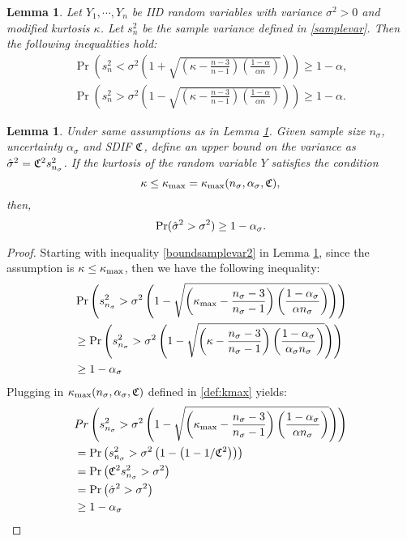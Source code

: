\documentclass{iitthesis}
\newtheorem{lemma}[theorem]{Lemma}
\theoremstyle{definition}
\begin{document}
\begin{lemma}\cite[Lemma 1]{HJLO12} \label{samplevarbound}
Let $Y_1,\cdots,Y_n$ be IID random variables with variance $\sigma^2>0$ and modified kurtosis $\kappa$. Let $s_n^2$ be the sample variance defined in \eqref{samplevar}. Then the following inequalities hold: 
\begin{subequations}
\begin{gather}
\Pr\left( s_n^2 < \sigma^2 \left (1+\sqrt{\left (\kappa-\frac{n-3}{n-1}\right)\left (\frac{1-\alpha}{\alpha n}\right )}\right)\right) \geq 1-\alpha,\label{boundsamplevar1}\\ 
\Pr\left( s_n^2 >\sigma^2 \left (1-\sqrt{\left (\kappa-\frac{n-3}{n-1}\right)\left (\frac{1-\alpha}{\alpha n}\right )}\right)\right) \geq 1-\alpha.\label{boundsamplevar2}
\end{gather}
\end{subequations}

\end{lemma}
\begin{lemma}\label{lowerboundhsigma}
Under same assumptions as in Lemma \ref{samplevarbound}. Given sample size $n_\sigma$, uncertainty $\alpha_\sigma$ and SDIF $\mathfrak{C}$, define an upper bound on the variance as $\hat{\sigma}^2 = \mathfrak{C}^2 s_{n_{\sigma}}^2$. If the kurtosis of the random variable $Y$ satisfies the condition $$\kappa \leq \kappa_{\max} =\kappa_{\max} (n_\sigma,\alpha_\sigma, \mathfrak{C}),$$ then, $$\Pr (\hat{\sigma}^2 > \sigma^2)\geq 1-\alpha_{\sigma}.$$
\end{lemma}
\begin{proof}
Starting with inequality \eqref{boundsamplevar2} in Lemma \ref{samplevarbound}, since the assumption is $\kappa \leq \kappa_{\max}$, then we have the following inequality: 
\begin{align*}
&\Pr\left( s_{n_{\sigma}}^2 > \sigma^2 \left (1-\sqrt{\left (\kappa_{\max} -\frac{n_{\sigma}-3}{n_{\sigma}-1}\right)\left (\frac{1-\alpha_{\sigma}}{\alpha n_{\sigma}}\right )}\right)\right)\\& \geq\Pr\left( s_{n_{\sigma}}^2 > \sigma^2 \left (1-\sqrt{\left (\kappa-\frac{n_{\sigma}-3}{n_{\sigma}-1}\right)\left (\frac{1-\alpha_{\sigma}}{\alpha_{\sigma} n_{\sigma}}\right )}\right)\right)\\&\geq1-\alpha_{\sigma} 
\end{align*}
 Plugging in $\kappa_{\max}(n_\sigma,\alpha_\sigma, \mathfrak{C})$ defined in \eqref{def:kmax} yields:
 \begin{align*}
&Pr\left( s_{n_{\sigma}}^2 > \sigma^2 \left (1-\sqrt{\left (\kappa_{\max} -\frac{n_{\sigma}-3}{n_{\sigma}-1}\right)\left (\frac{1-\alpha_{\sigma}}{\alpha n_{\sigma}}\right )}\right)\right)\\&
=  \Pr\left( s_{n_{\sigma}}^2 > \sigma^2 \left (1-\left(1-1/\mathfrak{C}^2\right)\right) \right) \\&
=\Pr\left(\mathfrak{C}^2s_{n_{\sigma}}^2  > \sigma^2 \right) \\&
=\Pr\left(\hat{\sigma}^2  > \sigma^2 \right) \\&
\geq  1-\alpha_{\sigma} 
\end{align*}
\end{proof}
\end{document}
